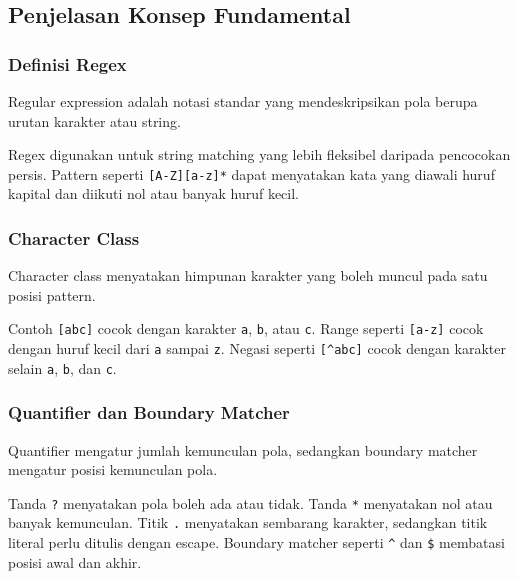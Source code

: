 \subsection{Penjelasan Konsep Fundamental}
\subsubsection{Definisi Regex}
\begin{jawab}
Regular expression adalah notasi standar yang mendeskripsikan pola berupa urutan karakter atau string.
\end{jawab}

Regex digunakan untuk string matching yang lebih fleksibel daripada pencocokan persis. Pattern seperti \texttt{[A-Z][a-z]*} dapat menyatakan kata yang diawali huruf kapital dan diikuti nol atau banyak huruf kecil.

\subsubsection{Character Class}
\begin{jawab}
Character class menyatakan himpunan karakter yang boleh muncul pada satu posisi pattern.
\end{jawab}

Contoh \texttt{[abc]} cocok dengan karakter \texttt{a}, \texttt{b}, atau \texttt{c}. Range seperti \texttt{[a-z]} cocok dengan huruf kecil dari \texttt{a} sampai \texttt{z}. Negasi seperti \texttt{[\^{}abc]} cocok dengan karakter selain \texttt{a}, \texttt{b}, dan \texttt{c}.

\subsubsection{Quantifier dan Boundary Matcher}
\begin{jawab}
Quantifier mengatur jumlah kemunculan pola, sedangkan boundary matcher mengatur posisi kemunculan pola.
\end{jawab}

Tanda \texttt{?} menyatakan pola boleh ada atau tidak. Tanda \texttt{*} menyatakan nol atau banyak kemunculan. Titik \texttt{.} menyatakan sembarang karakter, sedangkan titik literal perlu ditulis dengan escape. Boundary matcher seperti \texttt{\^{}} dan \texttt{\$} membatasi posisi awal dan akhir.

